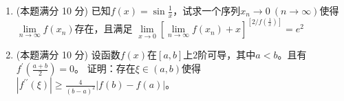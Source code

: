 \begin{enumerate}
{	\textbf{拆项.} 分子中 $(1-2x)y=(v-u)y$，故
	\[
	P:=\frac{(1-2x)y}{uv}=\frac{y}{u}-\frac{y}{v} .
	\]
	又由 $xv-(x-1)u=x(u-2x+1)-(xu-u)=-\left(x^{2}-y^{2}-x\right)$ 得
	\[
	Q:=\frac{x^{2}-y^{2}-x}{uv}=\frac{x-1}{v}-\frac{x}{u} .
	\]
	于是
	\begin{align*}
	P\,dx+Q\,dy
	&=-\frac{-y\,dx+x\,dy}{x^{2}+y^{2}}
	+\frac{-y\,dx+(x-1)dy}{(x-1)^{2}+y^{2}} .
	\end{align*}

	\textbf{逐项积分.} 两个奇点 $(0,0)$ 与 $(1,0)$ 都在 $L:\ x^{2}+y^{2}=4$ 的内部。
	上式每一项在各自奇点之外都满足 $\frac{\partial Q}{\partial x}=\frac{\partial P}{\partial y}$，
	故可用挖点法把 $L$ 分别收缩到绕该奇点的小圆周，得到熟知的结果
	\[
	\oint_L\frac{-y\,dx+x\,dy}{x^{2}+y^{2}}=2\pi,\qquad
	\oint_L\frac{-y\,dx+(x-1)dy}{(x-1)^{2}+y^{2}}=2\pi .
	\]
	两者相减，
	\[
	I=-2\pi+2\pi=0 .
	\]
	（沿 $x=2\cos t$、$y=2\sin t$ 作数值积分，结果确为 $0$。）
}


\item 
(本题满分 10 分)
已知$ f(x)=\sin \frac{1}{x} $，试求一个序列$ x_{n} \rightarrow 0 \ (n \rightarrow \infty) $使得$ \lim\limits _{n \rightarrow \infty} f\left(x_{n}\right) $存在，且满足
$ \lim\limits _{x \rightarrow 0}\left[\lim\limits _{n \rightarrow \infty} f\left(x_{n}\right)+x\right]^{\left[ 2/f(\frac{1}{x}) \right]}=e^{2} $



\item 
(本题满分 10 分)
设函数$ f(x) $在$[a, b]$上$ 2 $阶可导，其中$ a<b $。且有$ f^{\prime}\left(\frac{a+b}{2}\right)=0 $。
证明：存在$ \xi	\in(a,b) $使得$\left|f^{\prime \prime}(\xi)\right| \geq \frac{4}{(b-a)^{2}}|f(b)-f(a)|$。



\end{enumerate}
